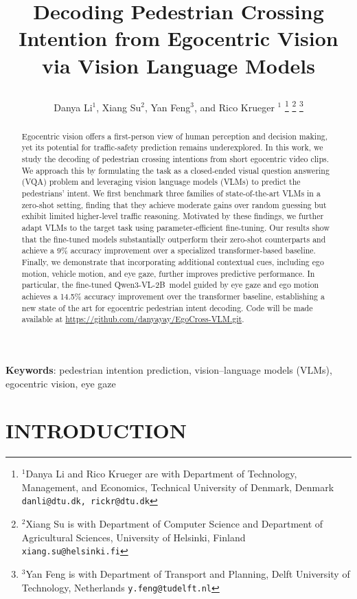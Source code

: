 \documentclass[letterpaper, 10pt, journal]{IEEEtran}  %
\title{\LARGE \bf

Decoding Pedestrian Crossing Intention from Egocentric Vision \\ 
via Vision Language Models
}
\author{Danya Li$^{1}$, Xiang Su$^{2}$, Yan Feng$^{3}$, and Rico Krueger $^{1}$%
\thanks{$^{1}$Danya Li and Rico Krueger are with Department of Technology, Management, and Economics, Technical University of Denmark, Denmark
        {\tt\small danli@dtu.dk, rickr@dtu.dk}}%
\thanks{$^{2}$Xiang Su is with Department of Computer Science and Department of Agricultural Sciences, University of Helsinki, Finland
    {\tt\small xiang.su@helsinki.fi}}
\thanks{$^{3}$Yan Feng is with Department of Transport and Planning, Delft University of Technology, Netherlands
    {\tt\small y.feng@tudelft.nl}
}
}
\newcommand{\qwentwob}{Qwen3-VL-2B}
\begin{document}
\maketitle
\thispagestyle{plain}
\pagestyle{plain}


\begin{abstract}

Egocentric vision offers a first-person view of human perception and decision making, yet its potential for traffic-safety prediction remains underexplored. In this work, we study the decoding of pedestrian crossing intentions from short egocentric video clips. We approach this by formulating the task as a closed-ended visual question answering (VQA) problem and leveraging vision language models (VLMs) to predict the pedestrians' intent. We first benchmark three families of state-of-the-art VLMs in a zero-shot setting, finding that they achieve moderate gains over random guessing but exhibit limited higher-level traffic reasoning. Motivated by these findings, we further adapt VLMs to the target task using parameter-efficient fine-tuning. Our results show that the fine-tuned models substantially outperform their zero-shot counterparts and achieve a 9\% accuracy improvement over a specialized transformer-based baseline. Finally, we demonstrate that incorporating additional contextual cues, including ego motion, vehicle motion, and eye gaze, further improves predictive performance. In particular, the fine-tuned \qwentwob\ model guided by eye gaze and ego motion achieves a 14.5\% accuracy improvement over the transformer baseline, establishing a new state of the art for egocentric pedestrian intent decoding.
Code will be made available at \url{https://github.com/danyayay/EgoCross-VLM.git}.

\end{abstract}

\vspace{0.6em}
\noindent
\textbf{Keywords}: pedestrian intention prediction, vision--language models (VLMs), egocentric vision, eye gaze

\section{INTRODUCTION}
\end{document}
